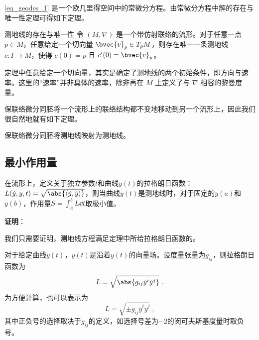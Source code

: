 \autoref{eq_geodes_1} 是一个欧几里得空间中的常微分方程。由常微分方程中解的存在与唯一性定理可得如下定理。

\begin{theorem}{测地线的存在与唯一性}
令 $(M, \nabla)$ 是一个带仿射联络的流形。对于任意一点 $p\in M$，任意给定一个切向量 $\bvec{v}_p\in T_pM$，则存在唯一一条测地线 $c:I\to M$，使得 $c(0)=p$ 且 $c'(0)=\bvec{v}_p$。
\end{theorem}

定理中任意给定一个切向量，其实是确定了测地线的两个初始条件，即方向与速率。这里的“速率”并非具体的速率，除非再在 $M$ 上定义了与 $\nabla$ 相容的黎曼度量。

保联络微分同胚将一个流形上的联络结构都不变地移动到另一个流形上，因此我们很自然地就有如下定理。

\begin{theorem}{}
保联络微分同胚将测地线映射为测地线。
\end{theorem}



\subsection{最小作用量}

\begin{theorem}{}
在流形上，定义关于独立参数$t$和曲线$y(t)$的拉格朗日函数：$L(\dot{y}, y, t) = \sqrt{\abs{\langle \dot{y}, \dot{y} \rangle}}$，则当曲线$y(t)$是测地线时，对于固定的$y(a)$和$y(b)$，作用量$S=\int_a^b L \dd t$取极小值。
\end{theorem}

\textbf{证明}：

我们只需要证明，测地线方程满足定理中所给拉格朗日函数的。

对于给定曲线$y(t)$，$\dot{y}(t)$是沿着$y(t)$的向量场。设度量张量为$g_{ij}$，则拉格朗日函数为
\begin{equation}
L = \sqrt{\abs{g_{ij}\dot{y}^i\dot{y}^j}}~.
\end{equation}
为方便计算，也可以表示为
\begin{equation}
L = \sqrt{\pm{g_{ij}\dot{y}^i\dot{y}^j}}~,
\end{equation}
其中正负号的选择取决于$g_{ij}$的定义，如选择号差为$-2$的闵可夫斯基度量时取负号。

